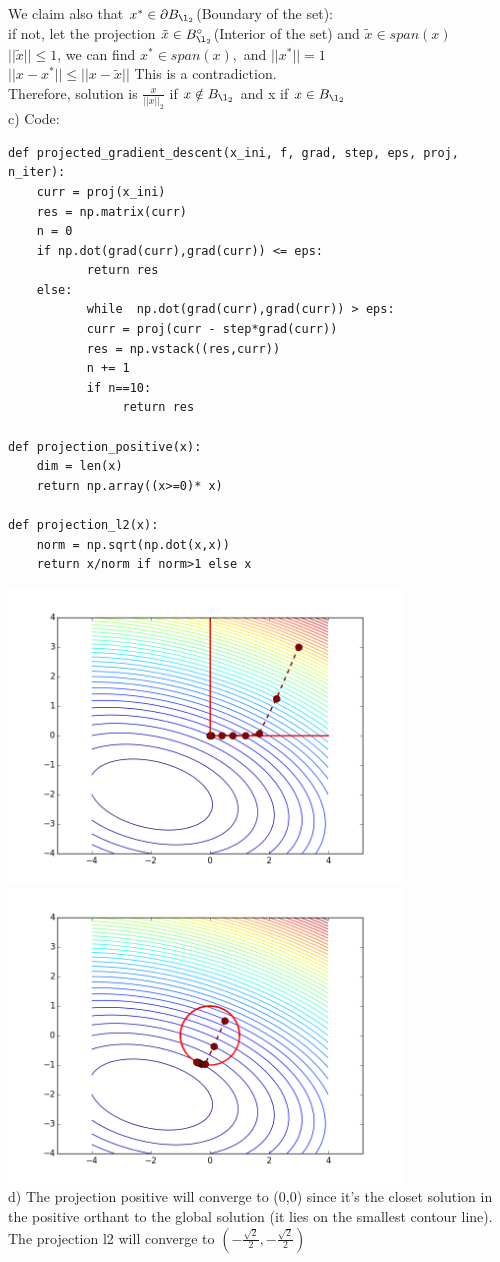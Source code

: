 \documentclass[11pt]{article}
\begin{document}
We claim also that $x^* \in \partial B_{\l_2}$(Boundary of the set):\\
if not, let the projection $\tilde{x}\in  B_{\l_2}^\circ$(Interior of the set)  and $\tilde{x} \in span(x)$\\
$||\tilde{x}|| \leq 1$, we can find $x^* \in span(x),$ and $||x^*|| = 1$\\
$||x-x^*|| \leq ||x - \tilde{x}||$ This is a contradiction.\\
Therefore, solution is $\frac{x}{||x||_2}$ if $x \notin B_{\l_2}$ and x if $x \in B_{\l_2}$\\

c) Code:\\
\begin{verbatim}
def projected_gradient_descent(x_ini, f, grad, step, eps, proj, n_iter):
    curr = proj(x_ini)
    res = np.matrix(curr)
    n = 0
    if np.dot(grad(curr),grad(curr)) <= eps:
           return res 
    else: 
           while  np.dot(grad(curr),grad(curr)) > eps:
           curr = proj(curr - step*grad(curr))
           res = np.vstack((res,curr))
           n += 1
           if n==10:
                return res

def projection_positive(x):
    dim = len(x)
    return np.array((x>=0)* x)

def projection_l2(x):
    norm = np.sqrt(np.dot(x,x))
    return x/norm if norm>1 else x
\end{verbatim}

\includegraphics[width = 4.1in]{3-1}\\
\includegraphics[width = 4.1in]{3-2}\\

d) The projection positive will converge to (0,0) since it's the closet solution in the positive orthant to the global solution (it lies on the smallest contour line). The projection l2 will converge to $(-\frac{\sqrt{2}}{2},-\frac{\sqrt{2}}{2})$
\end{document}
